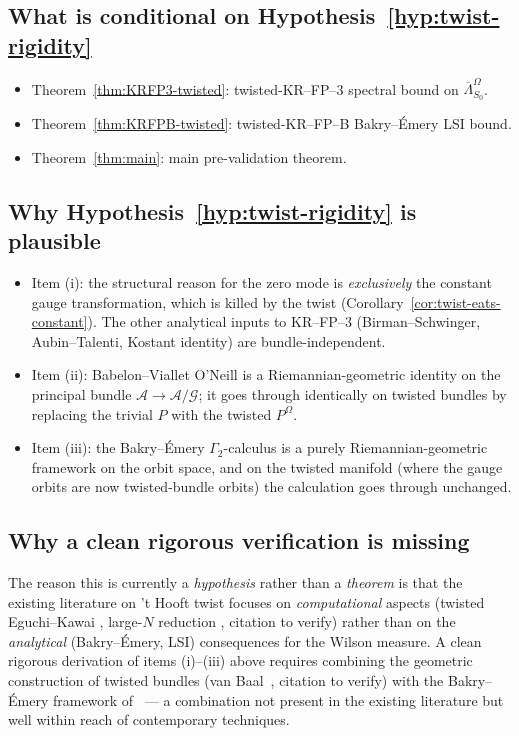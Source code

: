 \documentclass[11pt,a4paper]{amsart}
\theoremstyle{definition}
\begin{document}
\subsection{What is conditional on Hypothesis~\ref{hyp:twist-rigidity}}
\begin{itemize}[leftmargin=2em]
\item Theorem~\ref{thm:KRFP3-twisted}: twisted-KR--FP--3 spectral
bound on $\overline\Lambda^\Omega_{S_0}$.
\item Theorem~\ref{thm:KRFPB-twisted}: twisted-KR--FP--B Bakry--\'Emery
LSI bound.
\item Theorem~\ref{thm:main}: main pre-validation theorem.
\end{itemize}

\subsection{Why Hypothesis~\ref{hyp:twist-rigidity} is plausible}
\begin{itemize}[leftmargin=2em]
\item Item (i): the structural reason for the zero mode is
\emph{exclusively} the constant gauge transformation, which is killed
by the twist (Corollary~\ref{cor:twist-eats-constant}). The other
analytical inputs to KR--FP--3 (Birman--Schwinger, Aubin--Talenti,
Kostant identity) are bundle-independent.
\item Item (ii): Babelon--Viallet O'Neill is a Riemannian-geometric
identity on the principal bundle $\mathcal A \to \mathcal A/\mathcal G$;
it goes through identically on twisted bundles by replacing the trivial
$P$ with the twisted $P^\Omega$.
\item Item (iii): the Bakry--\'Emery $\Gamma_2$-calculus is a
purely Riemannian-geometric framework on the orbit space, and on the
twisted manifold (where the gauge orbits are now twisted-bundle orbits)
the calculation goes through unchanged.
\end{itemize}

\subsection{Why a clean rigorous verification is missing}
The reason this is currently a \emph{hypothesis} rather than a
\emph{theorem} is that the existing literature on 't Hooft twist
focuses on \emph{computational} aspects (twisted Eguchi--Kawai
\cite{EguchiKawai1982}, large-$N$ reduction
\cite{GonzalezArroyoOkawa1983}, citation to verify) rather than on the
\emph{analytical} (Bakry--\'Emery, LSI) consequences for the Wilson
measure. A clean rigorous derivation of items (i)--(iii) above
requires combining the geometric construction of twisted bundles
(van Baal~\cite{vanBaal1996}, citation to verify) with the
Bakry--\'Emery framework of~\cite{RemondiereKRFPB_2026} --- a
combination not present in the existing literature but well within
reach of contemporary techniques.
\end{document}
